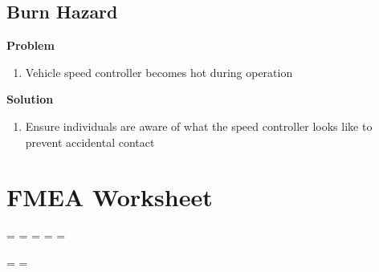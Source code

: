 \documentclass [10pt]{article}
\begin{document}
\subsection{Burn Hazard}
\textbf{Problem}
\begin{enumerate}[label = - , leftmargin=.3in]
        \item Vehicle speed controller becomes hot during operation 
    \end{enumerate}

\textbf{Solution}
\begin{enumerate}[label = - , leftmargin=.3in]
        \item Ensure individuals are aware of what the speed controller looks like to prevent accidental contact
        
    \end{enumerate}


\section{FMEA Worksheet}


%




\newpage
\pagestyle{fancy}

\paperwidth=\pdfpageheight
\paperheight=\pdfpagewidth
\pdfpageheight=\paperheight
\pdfpagewidth=\paperwidth
\headwidth=\textheight


\begingroup

\vsize=\textwidth
\hsize=\textheight
\end{document}
